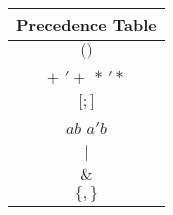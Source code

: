 \begin{tabular}{ |c| }
    \hline
    \textbf{Precedence Table} \\
    \hline
    $($\quad$)$ \\
    \hline
    $+$ \quad $'+$ \quad $*$ \quad $'*$ \\
    \hline
    $[$\quad$;$\quad$]$ \\
    \hline
    $ab$ \quad $a'b$ \\
    \hline
    $|$ \\
    \hline
    $\&$ \\
    \hline
    $\{$\quad$,$\quad$\}$ \\
    \hline
\end{tabular}
